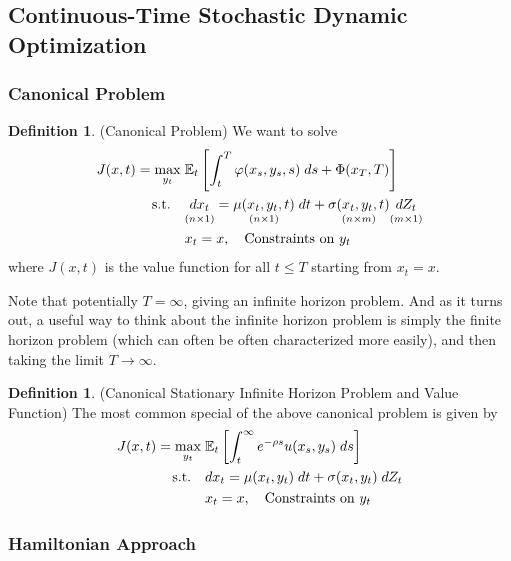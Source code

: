 \documentclass[12pt]{article}
\numberwithin{equation}{section} %
\theoremstyle{plain}
\theoremstyle{definition}
\newtheorem{defn}[thm]{Definition}
\theoremstyle{remark}
\newcommand{\ra}{\rightarrow}
\newcommand{\E}{\mathbb{E}}
\begin{document}
\clearpage
\subsection{Continuous-Time Stochastic Dynamic Optimization}

\subsubsection{Canonical Problem}

\begin{defn}(Canonical Problem)
We want to solve
\begin{align}
  J(x,t)
  =
  \max_{y_t}
  \;&
  \E_t\left[
    \int_t^T
    \varphi(x_s,y_s,s)\;ds
    +
    \Phi(x_T,T)
  \right]
  \notag
  \\
  \qquad\text{s.t.}\quad
  &
  \underset{(n\times 1)}{%
    \vphantom{\mu(x_t,y_t,t)}
    dx_t
  }
  =
  \underset{(n\times 1)}{%
    \mu(x_t,y_t,t)
  }
  \;dt
  +
  \underset{(n\times m)}{%
    \vphantom{\mu(x_t,y_t,t)}
    \sigma(x_t,y_t,t)
  }
  \underset{(m\times 1)}{%
    \vphantom{\mu(x_t,y_t,t)}
    dZ_t
  }
  \notag
  \\
  & x_t = x,\quad
  \text{Constraints on $y_t$}
  \notag
\end{align}
where $J(x,t)$ is the value function for all $t\leq T$ starting from
$x_t=x$.

Note that potentially $T=\infty$, giving an infinite horizon problem.
And as it turns out, a useful way to think about the infinite horizon
problem is simply the finite horizon problem (which can often be
often characterized more easily), and then taking the limit
$T\ra\infty$.
\end{defn}

\begin{defn}
(Canonical Stationary Infinite Horizon Problem and Value Function)
The most common special of the above canonical problem is given by
\begin{align}
  J(x,t)
  =
  \max_{y_t}
  \;&
  \E_t\left[
    \int_t^\infty
    e^{-\rho s}
    u(x_s,y_s)
    \;ds
  \right]
  \notag
  \\
  \qquad\text{s.t.}\quad
  &
  dx_t
  =
  \mu(x_t,y_t)\;dt
  +
  \sigma(x_t,y_t)\;dZ_t
  \notag
  \\
  & x_t=x,
  \quad\text{Constraints on $y_t$}
  \notag
\end{align}
\end{defn}


\subsubsection{Hamiltonian Approach}
\end{document}
